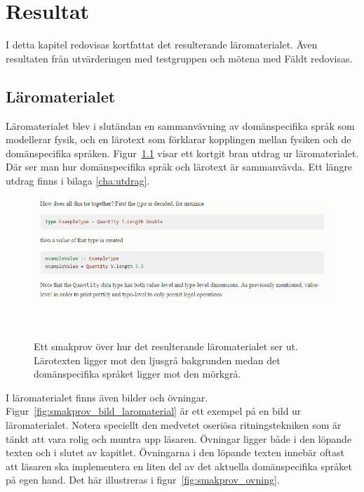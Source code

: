 
\chapter{Resultat}

I detta kapitel redovisas kortfattat det resulterande läromaterialet. Även resultaten från utvärderingen med testgruppen och mötena med Fäldt redovisas.

\begin{draft}

\section{Läromaterialet}

Läromaterialet blev i slutändan en sammanvävning av domänspecifika språk som
modellerar fysik, och en lärotext som förklarar kopplingen mellan fysiken och de
domänspecifika språken. Figur~\ref{fig:smakprov_laromaterial} visar ett kortgit bran
utdrag ur läromaterialet. Där ser man hur domänspecifika språk och lärotext är
sammanvävda. Ett längre utdrag finns i bilaga \ref{cha:utdrag}.

\begin{figure}[tph]
  \includegraphics[width=\linewidth]{figure/smakprov_laromaterial.png}
  \caption{Ett smakprov över hur det resulterande läromaterialet ser ut.
           Lärotexten ligger mot den ljusgrå bakgrunden medan det
           domänspecifika språket ligger mot den
           mörkgrå.}~\label{fig:smakprov_laromaterial} 
\end{figure}

I läromaterialet finns även bilder och övningar. Figur~\ref{fig:smakprov_bild_laromaterial} är ett exempel på en bild ur läromaterialet. Notera speciellt den medvetet oseriösa ritningstekniken som är tänkt att vara rolig och muntra upp läsaren. Övningar ligger både i den löpande texten och i slutet av kapitlet. Övningarna i den löpande texten innebär oftast att läsaren ska implementera en liten del av det aktuella domänspecifika språket på egen hand. Det här illustreras i figur~\ref{fig:smakprov_ovning}.


\end{draft}
